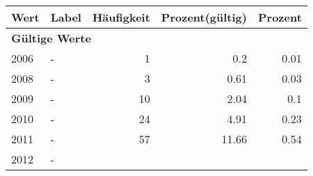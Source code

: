      \begin{longtable}{lXrrr}
     \toprule
     \textbf{Wert} & \textbf{Label} & \textbf{Häufigkeit} & \textbf{Prozent(gültig)} & \textbf{Prozent} \\
     \endhead
     \midrule
     \multicolumn{5}{l}{\textbf{Gültige Werte}}\\

     2006 &
     \multicolumn{1}{X}{ -  } &


       \num{1} &
       \num[round-mode=places,round-precision=2]{0.2} &
         \num[round-mode=places,round-precision=2]{0.01} \\

     2008 &
     \multicolumn{1}{X}{ -  } &


       \num{3} &
       \num[round-mode=places,round-precision=2]{0.61} &
         \num[round-mode=places,round-precision=2]{0.03} \\

     2009 &
     \multicolumn{1}{X}{ -  } &


       \num{10} &
       \num[round-mode=places,round-precision=2]{2.04} &
         \num[round-mode=places,round-precision=2]{0.1} \\

     2010 &
     \multicolumn{1}{X}{ -  } &


       \num{24} &
       \num[round-mode=places,round-precision=2]{4.91} &
         \num[round-mode=places,round-precision=2]{0.23} \\

     2011 &
     \multicolumn{1}{X}{ -  } &


       \num{57} &
       \num[round-mode=places,round-precision=2]{11.66} &
         \num[round-mode=places,round-precision=2]{0.54} \\

     2012 &
     \multicolumn{1}{X}{ -  } &



\end{longtable}
